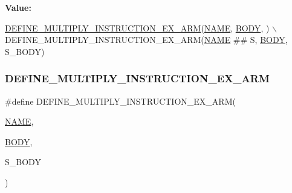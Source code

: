 {\bfseries Value\+:}
\begin{DoxyCode}
\mbox{\hyperlink{isa-arm_8c_ac91392eda72339bc29cd80f786531925}{DEFINE\_MULTIPLY\_INSTRUCTION\_EX\_ARM}}(\mbox{\hyperlink{inflate_8h_a164ea0159d5f0b5f12a646f25f99eceaa67bc2ced260a8e43805d2480a785d312}{NAME}}, 
      \mbox{\hyperlink{gzlog_8c_aa6bdf6a6d9916c343e1e17774d84a156}{BODY}}, ) \(\backslash\)
    DEFINE\_MULTIPLY\_INSTRUCTION\_EX\_ARM(\mbox{\hyperlink{inflate_8h_a164ea0159d5f0b5f12a646f25f99eceaa67bc2ced260a8e43805d2480a785d312}{NAME}} ## S, \mbox{\hyperlink{gzlog_8c_aa6bdf6a6d9916c343e1e17774d84a156}{BODY}}, S\_BODY)
\end{DoxyCode}
\mbox{\label{isa-arm_8c_ac91392eda72339bc29cd80f786531925}} 
\subsubsection{\texorpdfstring{D\+E\+F\+I\+N\+E\+\_\+\+M\+U\+L\+T\+I\+P\+L\+Y\+\_\+\+I\+N\+S\+T\+R\+U\+C\+T\+I\+O\+N\+\_\+\+E\+X\+\_\+\+A\+RM}{DEFINE\_MULTIPLY\_INSTRUCTION\_EX\_ARM}}
{\footnotesize\ttfamily \#define D\+E\+F\+I\+N\+E\+\_\+\+M\+U\+L\+T\+I\+P\+L\+Y\+\_\+\+I\+N\+S\+T\+R\+U\+C\+T\+I\+O\+N\+\_\+\+E\+X\+\_\+\+A\+RM(\begin{DoxyParamCaption}\item[{}]{\mbox{\hyperlink{inflate_8h_a164ea0159d5f0b5f12a646f25f99eceaa67bc2ced260a8e43805d2480a785d312}{N\+A\+ME}},  }\item[{}]{\mbox{\hyperlink{gzlog_8c_aa6bdf6a6d9916c343e1e17774d84a156}{B\+O\+DY}},  }\item[{}]{S\+\_\+\+B\+O\+DY }\end{DoxyParamCaption})}

